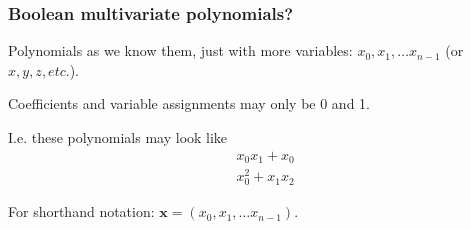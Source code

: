 \documentclass{beamer}
\begin{document}







\begin{frame}
    \frametitle{Boolean multivariate polynomials?}
    Polynomials as we know them, just with more variables: $x_0, x_1, \dots x_{n - 1}$ (or $x, y, z, etc.$).

    \pause 
    
    Coefficients and variable assignments may only be 0 and 1.

    \pause 

    I.e. these polynomials may look like 
    \begin{equation*}
        \begin{split}
            &x_0x_1 + x_0\\
            &x_0^2 + x_1x_2
        \end{split}
    \end{equation*}

    \pause

    For shorthand notation: $\mathbf{x} = (x_0, x_1, \dots x_{n - 1})$.

\end{frame}
\end{document}
